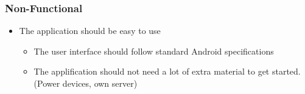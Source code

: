 \subsubsection{Non-Functional}

\begin{itemize}
\item The application should be easy to use
\begin{itemize}
\item The user interface should follow standard Android specifications 
\item The applification should not need a lot of extra material to get started. (Power devices, own server)
\end{itemize}
\end{itemize}


